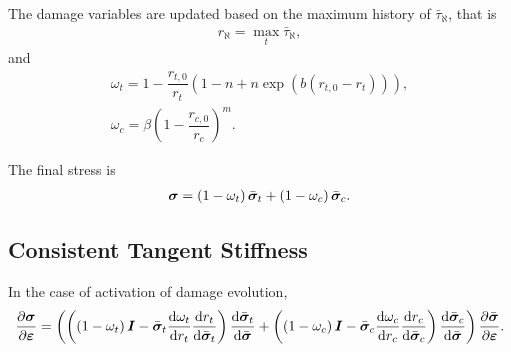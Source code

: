 The damage variables are updated based on the maximum history of $\bar{\tau}_{\aleph}$, that is
\begin{gather}
r_\aleph=\max_t\bar{\tau}_{\aleph},
\end{gather}
and
\begin{gather}
\omega_t=1-\dfrac{r_{t,0}}{r_t}\left(1-n+n\exp\left(b\left(r_{t,0}-r_t\right)\right)\right),\\
\omega_c=\beta\left(1-\dfrac{r_{c,0}}{r_c}\right)^m.
\end{gather}

The final stress is
\begin{gather}
\bm{\sigma}=\left(1-\omega_t\right)\bar{\bm{\sigma}}_t+\left(1-\omega_c\right)\bar{\bm{\sigma}}_c.
\end{gather}
\subsection{Consistent Tangent Stiffness}
In the case of activation of damage evolution,
\begin{gather}
\dfrac{\partial{\bm{\sigma}}}{\partial{\bm{\varepsilon}}}=\left(\left(\left(1-\omega_t\right)\bm{I}-\bar{\bm{\sigma}}_t\dfrac{\mathrm{d}\omega_t}{\mathrm{d}r_t}\dfrac{\mathrm{d}r_t}{\mathrm{d}\bar{\bm{\sigma}}_t}\right)\dfrac{\mathrm{d}\bar{\bm{\sigma}}_t}{\mathrm{d}\bar{\bm{\sigma}}}
+\left(\left(1-\omega_c\right)\bm{I}-\bar{\bm{\sigma}}_c\dfrac{\mathrm{d}\omega_c}{\mathrm{d}r_c}\dfrac{\mathrm{d}r_c}{\mathrm{d}\bar{\bm{\sigma}}_c}\right)\dfrac{\mathrm{d}\bar{\bm{\sigma}}_c}{\mathrm{d}\bar{\bm{\sigma}}}\right)\dfrac{\partial{\bar{\bm{\sigma}}}}{\partial{\bm{\varepsilon}}}.
\end{gather}
